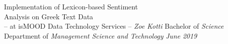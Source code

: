\documentclass[dvips,letterpaper,12pt]{report}
\begin{document}
\sloppy


\thesistitle
	{Implementation of Lexicon-based Sentiment \\
	\vspace{3mm}
	 Analysis on Greek Text Data \\
	\vspace{1cm}
	 -- at isMOOD Data Technology Services --}
	{\emph{Zoe Kotti}}
	{Bachelor of \emph{Science}}
	{Department of \emph{Management Science and Technology}}
	{\emph{June 2019}}

% 

% 
% 
% 

% 
% 
% 
% 
% 
% 

% 

% 
\end{document}
